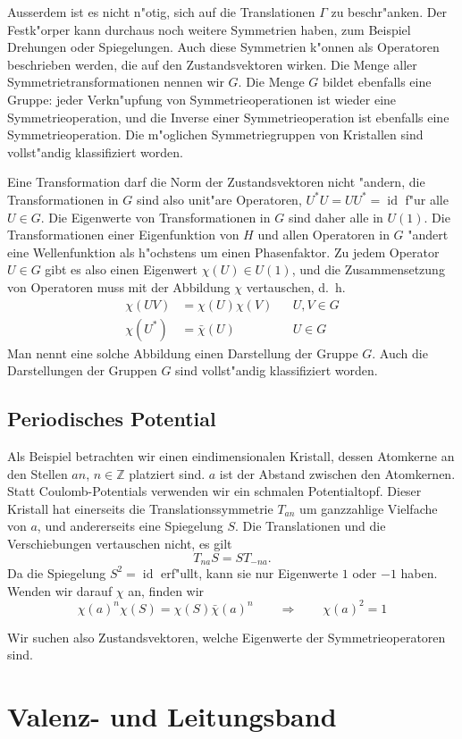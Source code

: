 Ausserdem ist es nicht n"otig, sich auf die Translationen $\Gamma$
zu beschr"anken.
Der Festk"orper kann durchaus noch weitere Symmetrien haben, zum
Beispiel Drehungen oder Spiegelungen.
Auch diese Symmetrien k"onnen als Operatoren beschrieben
werden, die auf den Zustandsvektoren wirken.
Die Menge aller Symmetrietransformationen nennen wir $G$.
Die Menge $G$ bildet ebenfalls eine Gruppe: jeder Verkn"upfung von
Symmetrieoperationen ist wieder eine Symmetrieoperation, und die
Inverse einer Symmetrieoperation ist ebenfalls eine Symmetrieoperation.
Die m"oglichen Symmetriegruppen von Kristallen sind vollst"andig
klassifiziert worden.

Eine Transformation darf die Norm der Zustandsvektoren nicht "andern,
die Transformationen in $G$ sind also unit"are Operatoren,
$U^*U=UU^*=\operatorname{id}$ f"ur alle $U\in G$.
Die Eigenwerte von Transformationen in $G$ sind daher alle in $U(1)$.
Die Transformationen einer Eigenfunktion von $H$ und allen Operatoren in $G$
"andert eine Wellenfunktion als h"ochstens um einen Phasenfaktor.
Zu jedem Operator $U\in G$ gibt es also einen Eigenwert $\chi(U)\in U(1)$,
und die Zusammensetzung von Operatoren muss mit der Abbildung $\chi$
vertauschen, d.~h.
\[
\begin{aligned}
\chi(UV)&=\chi(U)\chi(V)&&U,V\in G\\
\chi(U^*)&=\bar\chi(U)&&U\in G
\end{aligned}
\]
Man nennt eine solche Abbildung einen Darstellung der Gruppe $G$.
Auch die Darstellungen der Gruppen $G$ sind vollst"andig klassifiziert
worden.

\subsection{Periodisches Potential}
Als Beispiel betrachten wir einen eindimensionalen Kristall, dessen
Atomkerne an den Stellen $an$, $n\in\mathbb Z$ platziert sind.
$a$ ist der Abstand zwischen den Atomkernen.
Statt Coulomb-Potentials verwenden wir ein schmalen Potentialtopf.
Dieser Kristall hat einerseits die Translationssymmetrie $T_{an}$ um
ganzzahlige Vielfache von $a$, und andererseits eine Spiegelung $S$.
Die Translationen und die Verschiebungen vertauschen nicht, es gilt
\[
T_{na}S=ST_{-na}.
\]
Da die Spiegelung $S^2=\operatorname{id}$ erf"ullt, kann sie nur
Eigenwerte $1$ oder $-1$ haben.
Wenden wir darauf $\chi$ an, finden wir
\[
\chi(a)^n\chi(S)=\chi(S)\bar\chi(a)^n
\qquad \Rightarrow \qquad
\chi(a)^2=1
\]

Wir suchen also Zustandsvektoren, welche Eigenwerte der
Symmetrieoperatoren sind.

\section{Valenz- und Leitungsband}




